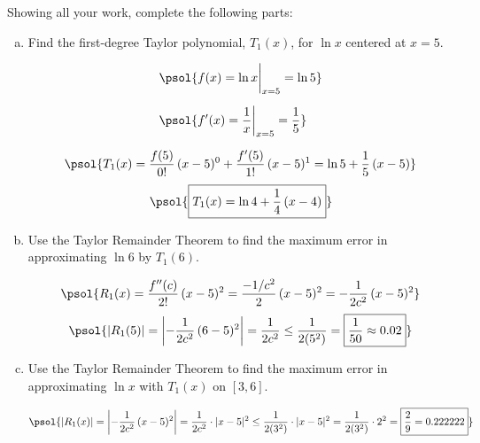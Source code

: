 \documentclass[12pt,letterpaper]{exam}
\begin{document}
\begin{questions}
\newpage
\question[16] Showing all your work, complete the following parts: 
	\begin{enumerate}[(a)]
	\item Find the first-degree Taylor polynomial, $T_1(x)$, for $\ln x$ centered at $x= 5$. \par\vspace{0.3cm}
		\[
		\begin{aligned}
		&\psol{f(x)= \ln x \bigg|_{x=5}= \ln 5} \\[0.2cm]
		&\psol{f'(x)= \dfrac{1}{x} \bigg|_{x=5}= \dfrac{1}{5}}
		\end{aligned}
		\] \par\vspace{0.2cm}
		\[
		\psol{T_1(x)= \dfrac{f(5)}{0!}\, (x - 5)^0 + \dfrac{f'(5)}{1!}\, (x - 5)^1= \ln 5 + \dfrac{1}{5} \, (x - 5)}
		\]
		\[
		\psol{\boxed{T_1(x)= \ln 4 + \dfrac{1}{4} \, (x - 4)}}
		\] \par\vspace{0.3cm}
	
	\item Use the Taylor Remainder Theorem to find the maximum error in approximating $\ln 6$  by $T_1(6)$. \par\vspace{0.3cm}
		\[
		\psol{R_1(x)= \dfrac{f''(c)}{2!} \,(x - 5)^2= \dfrac{-1/c^2}{2} \,(x - 5)^2= -\dfrac{1}{2c^2} \,(x - 5)^2}
		\]
		\[
		\psol{|R_1(5)|= \left| -\dfrac{1}{2c^2} \,(6 - 5)^2 \right|= \dfrac{1}{2c^2} \leq \dfrac{1}{2(5^2)}= \boxed{\dfrac{1}{50} \approx 0.02}}
		\] \par\vspace{0.7cm}
	
	\item Use the Taylor Remainder Theorem to find the maximum error in approximating $\ln x$ with $T_1(x)$ on $[3, 6]$. \par\vspace{0.3cm}
		\[
		\psol{|R_1(x)|= \left| -\dfrac{1}{2c^2} \,(x - 5)^2 \right|= \dfrac{1}{2c^2} \cdot |x - 5|^2 \leq \dfrac{1}{2(3^2)} \cdot |x - 5|^2= \dfrac{1}{2(3^2)} \cdot 2^2= \boxed{\dfrac{2}{9}= 0.222222}}
		\]
	\end{enumerate}




\end{questions}
\end{document}
